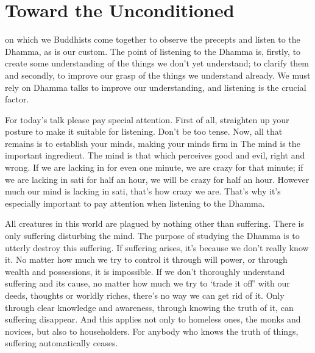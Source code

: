 
\chapter{Toward the Unconditioned}

 on which we Buddhists come together to observe the  precepts and listen to the Dhamma, as is our custom. The point of listening to the Dhamma is, firstly, to create some understanding of the things we don't yet understand; to clarify them and secondly, to improve our grasp of the things we understand already. We must rely on Dhamma talks to improve our understanding, and listening is the crucial factor.

For today's talk please pay special attention. First of all, straighten up your posture to make it suitable for listening. Don't be too tense. Now, all that remains is to establish your minds, making your minds firm in  The mind is the important ingredient. The mind is that which perceives good and evil, right and wrong. If we are lacking in  for even one minute, we are crazy for that minute; if we are lacking in sati for half an hour, we will be crazy for half an hour. However much our mind is lacking in sati, that's how crazy we are. That's why it's especially important to pay attention when listening to the Dhamma.

All creatures in this world are plagued by nothing other than suffering. There is only suffering disturbing the mind. The purpose of studying the Dhamma is to utterly destroy this suffering. If suffering arises, it's because we don't really know it. No matter how much we try to control it through will power, or through wealth and possessions, it is impossible. If we don't thoroughly understand suffering and its cause, no matter how much we try to `trade it off' with our deeds, thoughts or worldly riches, there's no way we can get rid of it. Only through clear knowledge and awareness, through knowing the truth of it, can suffering disappear. And this applies not only to homeless ones, the monks and novices, but also to householders. For anybody who knows the truth of things, suffering automatically ceases.

